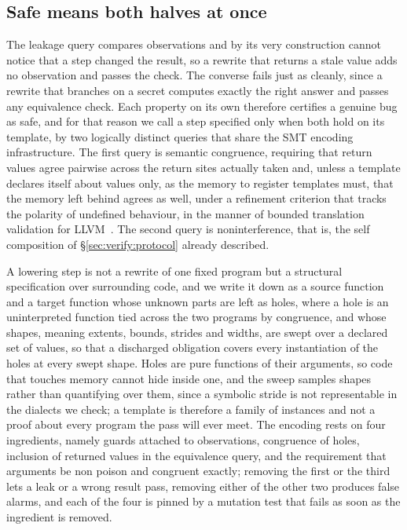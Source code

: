 \subsection{Safe means both halves at once}
\label{sec:verify:property}
The leakage query compares observations and by its very construction cannot notice that a step changed the result, so a rewrite that returns a stale value adds no observation and passes the check.
The converse fails just as cleanly, since a rewrite that branches on a secret computes exactly the right answer and passes any equivalence check.
Each property on its own therefore certifies a genuine bug as safe, and for that reason we call a step specified only when both hold on its template, by two logically distinct queries that share the SMT encoding infrastructure.
The first query is semantic congruence, requiring that return values agree pairwise across the return sites actually taken and, unless a template declares itself about values only, as the memory to register templates must, that the memory left behind agrees as well, under a refinement criterion that tracks the polarity of undefined behaviour, in the manner of bounded translation validation for LLVM~\cite{lopes2021alive2}.
The second query is noninterference, that is, the self composition of \S\ref{sec:verify:protocol} already described.

A lowering step is not a rewrite of one fixed program but a structural specification over surrounding code, and we write it down as a source function and a target function whose unknown parts are left as holes, where a hole is an uninterpreted function tied across the two programs by congruence, and whose shapes, meaning extents, bounds, strides and widths, are swept over a declared set of values, so that a discharged obligation covers every instantiation of the holes at every swept shape.
Holes are pure functions of their arguments, so code that touches memory cannot hide inside one, and the sweep samples shapes rather than quantifying over them, since a symbolic stride is not representable in the dialects we check; a template is therefore a family of instances and not a proof about every program the pass will ever meet.
The encoding rests on four ingredients, namely guards attached to observations, congruence of holes, inclusion of returned values in the equivalence query, and the requirement that arguments be non poison and congruent exactly; removing the first or the third lets a leak or a wrong result pass, removing either of the other two produces false alarms, and each of the four is pinned by a mutation test that fails as soon as the ingredient is removed.
